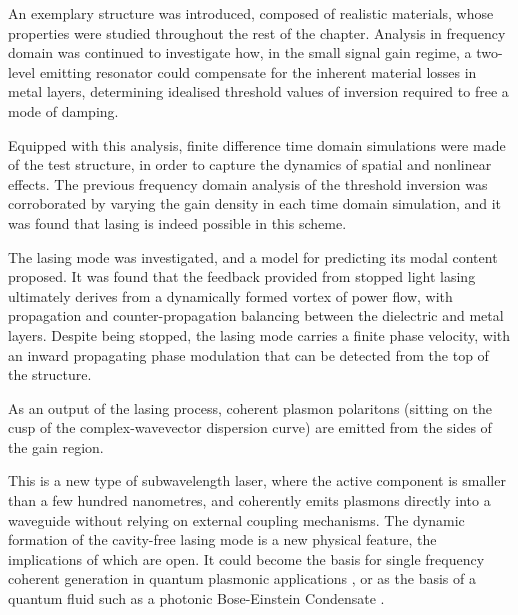 An exemplary structure was introduced, composed of realistic
materials, whose properties were studied throughout the rest of the chapter.
Analysis in frequency domain was continued to investigate how, in the small
signal gain regime, a two-level emitting resonator could compensate for the
inherent material losses in metal layers, determining idealised threshold
values of inversion required to free a mode of damping.

Equipped with this analysis, finite difference time domain simulations were made
of the test structure, in order to capture the dynamics of spatial and nonlinear
effects.
The previous frequency domain analysis of the threshold inversion was
corroborated by varying the gain density in each time domain simulation, and it
was found that lasing is indeed possible in this scheme.

The lasing mode was investigated, and a model for predicting its modal content
proposed.
It was found that the feedback provided from stopped light lasing ultimately
derives from a dynamically formed vortex of power flow, with propagation and
counter-propagation balancing between the dielectric and metal layers.
Despite being stopped, the lasing mode carries a finite phase velocity, with an
inward propagating phase modulation that can be detected from the top of the
structure.

As an output of the lasing process, coherent plasmon polaritons (sitting on the
cusp of the complex-wavevector dispersion curve) are emitted from the sides of
the gain region.

This is a new type of subwavelength laser, where the active component is
smaller than a few hundred nanometres, and coherently emits plasmons directly
into a waveguide without relying on external coupling mechanisms.
The dynamic formation of the cavity-free lasing mode is a new physical feature,
the implications of which are open.
It could become the basis for single frequency coherent \spp generation in
quantum plasmonic applications \cite{Jacob2011,Tame2013}, or as the basis of a
quantum fluid such as a photonic Bose-Einstein Condensate \cite{Carusotto2013}.

